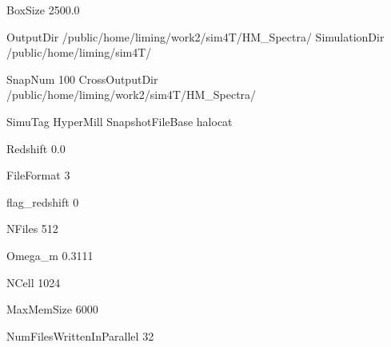 BoxSize            2500.0 %

OutputDir          /public/home/liming/work2/sim4T/HM_Spectra/
SimulationDir      /public/home/liming/sim4T/

SnapNum            100
CrossOutputDir     /public/home/liming/work2/sim4T/HM_Spectra/

SimuTag            HyperMill
SnapshotFileBase   halocat

Redshift           0.0

FileFormat         3

flag_redshift      0 

NFiles             512

Omega_m            0.3111

NCell              1024

MaxMemSize         6000 

NumFilesWrittenInParallel 32

